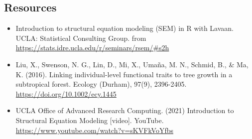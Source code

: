\documentclass[
]{article}
\begin{document}
\hypertarget{resources}{%
\subsection{Resources}\label{resources}}

\begin{itemize}
\item
  Introduction to structural equation modeling (SEM) in R with Lavaan.
  UCLA: Statistical Consulting Group. from
  \url{https://stats.idre.ucla.edu/r/seminars/rsem/\#s2h}
\item
  Liu, X., Swenson, N. G., Lin, D., Mi, X., Umaña, M. N., Schmid, B., \&
  Ma, K. (2016). Linking individual-level functional traits to tree
  growth in a subtropical forest. Ecology (Durham), 97(9), 2396-2405.
  \url{https://doi.org/10.1002/ecy.1445}
\item
  UCLA Office of Advanced Research Computing. (2021) Introduction to
  Structural Equation Modeling {[}video{]}. YouTube.
  \url{https://www.youtube.com/watch?v=sKVFkVoYfbs}
\end{itemize}
\end{document}
